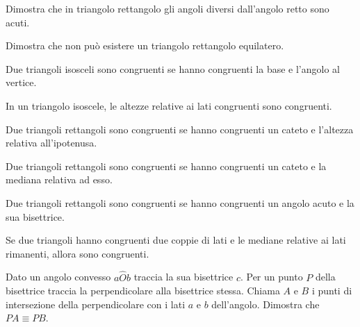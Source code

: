 \begin{multicols}{2}

\begin{esercizio}
\label{ese:3.53}
Dimostra che in triangolo rettangolo gli angoli diversi dall'angolo 
retto sono acuti.
\end{esercizio}

\begin{esercizio}
\label{ese:3.54}
Dimostra che non può esistere un triangolo rettangolo equilatero.
\end{esercizio}

\begin{esercizio}
\label{ese:3.55}
Due triangoli isosceli sono congruenti se hanno congruenti la base e 
l'angolo al vertice.
\end{esercizio}

\begin{esercizio}
\label{ese:3.56}
In un triangolo isoscele, le altezze relative ai lati congruenti sono 
congruenti. 
\end{esercizio}

\begin{esercizio}
\label{ese:3.57}
Due triangoli rettangoli sono congruenti se hanno congruenti un 
cateto e l'altezza relativa all'ipotenusa.
\end{esercizio}

\begin{esercizio}
\label{ese:3.58}
Due triangoli rettangoli sono congruenti se hanno congruenti un 
cateto e la mediana relativa ad esso.
\end{esercizio}

\begin{esercizio}
\label{ese:3.59}
Due triangoli rettangoli sono congruenti se hanno congruenti un 
angolo acuto e la sua bisettrice.
\end{esercizio}

\begin{esercizio}
\label{ese:3.60}
Se due triangoli hanno congruenti due coppie di lati e le mediane 
relative ai lati rimanenti, allora sono congruenti.
\end{esercizio}

\begin{esercizio}
\label{ese:3.69}
Dato un angolo convesso $a\widehat{O}b$ traccia la sua bisettrice 
$c$. Per un punto $P$ della bisettrice traccia la perpendicolare alla 
bisettrice stessa. Chiama $A$ e $B$ i punti di intersezione 
della perpendicolare con i lati $a$ e $b$ dell'angolo. 
Dimostra che $PA \equiv PB$.
\end{esercizio}


\end{multicols}
